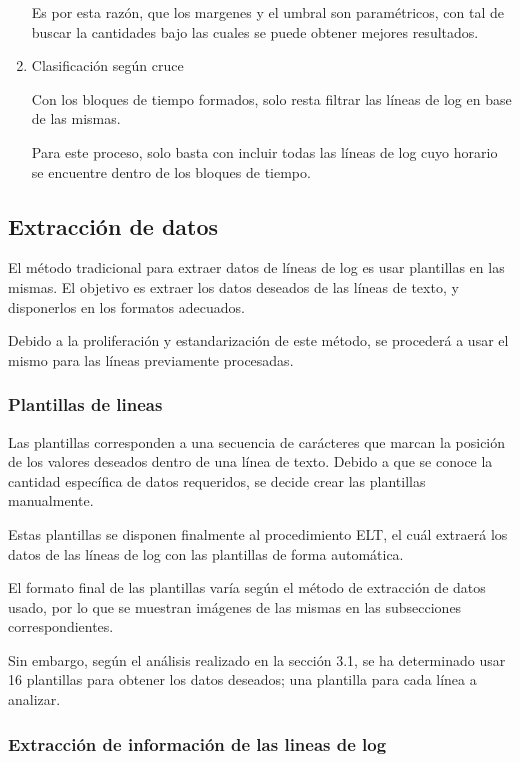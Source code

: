 \begin{enumerate}
    Es por esta razón, que los margenes y el umbral son paramétricos, con tal de buscar la cantidades bajo las cuales se puede obtener mejores resultados.

    \item{Clasificación según cruce}

    Con los bloques de tiempo formados, solo resta filtrar las líneas de log en base de las mismas.

    Para este proceso, solo basta con incluir todas las líneas de log cuyo horario se encuentre dentro de los bloques de tiempo.

\end{enumerate}

\subsection{Extracción de datos}

El método tradicional para extraer datos de líneas de log es usar plantillas en las mismas. El objetivo es extraer los datos deseados de las líneas de texto, y disponerlos en los formatos adecuados.

Debido a la proliferación y estandarización de este método, se procederá a usar el mismo para las líneas previamente procesadas.

\subsubsection{Plantillas de lineas}

Las plantillas corresponden a una secuencia de carácteres que marcan la posición de los valores deseados dentro de una línea de texto. Debido a que se conoce la cantidad específica de datos requeridos, se decide crear las plantillas manualmente.

Estas plantillas se disponen finalmente al procedimiento ELT, el cuál extraerá los datos de las líneas de log con las plantillas de forma automática.

El formato final de las plantillas varía según el método de extracción de datos usado, por lo que se muestran imágenes de las mismas en las subsecciones correspondientes.

Sin embargo, según el análisis realizado en la sección 3.1, se ha determinado usar 16 plantillas para obtener los datos deseados; una plantilla para cada línea a analizar.

\subsubsection{Extracción de información de las lineas de log}

